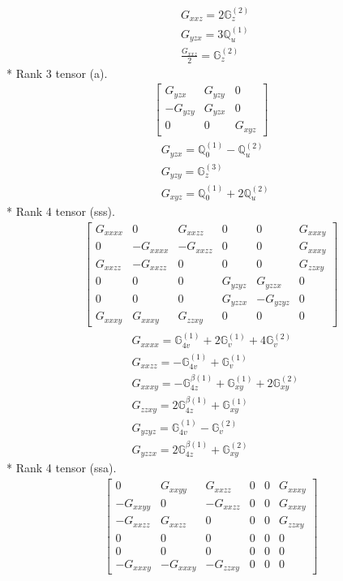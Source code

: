 \documentclass[fleqn,8pt,landscape]{jsarticle}
\begin{document}
\begin{align*}
& G_{xxz} = 2 \mathbb{G}_{z}^{(2)} \\
& G_{yzx} = 3 \mathbb{Q}_{u}^{(1)} \\
& \frac{G_{xxz}}{2} = \mathbb{G}_{z}^{(2)}
\end{align*}
* Rank 3 tensor (a).
\begin{align*}
\begin{bmatrix} G_{yzx} & G_{yzy} & 0 \\ - G_{yzy} & G_{yzx} & 0 \\ 0 & 0 & G_{xyz} \end{bmatrix}
\end{align*}
\begin{align*}
& G_{yzx} = \mathbb{Q}_{0}^{(1)} - \mathbb{Q}_{u}^{(2)} \\
& G_{yzy} = \mathbb{G}_{z}^{(3)} \\
& G_{xyz} = \mathbb{Q}_{0}^{(1)} + 2 \mathbb{Q}_{u}^{(2)}
\end{align*}
* Rank 4 tensor (sss).
\begin{align*}
\begin{bmatrix} G_{xxxx} & 0 & G_{xxzz} & 0 & 0 & G_{xxxy} \\ 0 & - G_{xxxx} & - G_{xxzz} & 0 & 0 & G_{xxxy} \\ G_{xxzz} & - G_{xxzz} & 0 & 0 & 0 & G_{zzxy} \\ 0 & 0 & 0 & G_{yzyz} & G_{yzzx} & 0 \\ 0 & 0 & 0 & G_{yzzx} & - G_{yzyz} & 0 \\ G_{xxxy} & G_{xxxy} & G_{zzxy} & 0 & 0 & 0 \end{bmatrix}
\end{align*}
\begin{align*}
& G_{xxxx} = \mathbb{G}_{4v}^{(1)} + 2 \mathbb{G}_{v}^{(1)} + 4 \mathbb{G}_{v}^{(2)} \\
& G_{xxzz} = - \mathbb{G}_{4v}^{(1)} + \mathbb{G}_{v}^{(1)} \\
& G_{xxxy} = - \mathbb{G}_{4z}^{\beta(1)} + \mathbb{G}_{xy}^{(1)} + 2 \mathbb{G}_{xy}^{(2)} \\
& G_{zzxy} = 2 \mathbb{G}_{4z}^{\beta(1)} + \mathbb{G}_{xy}^{(1)} \\
& G_{yzyz} = \mathbb{G}_{4v}^{(1)} - \mathbb{G}_{v}^{(2)} \\
& G_{yzzx} = 2 \mathbb{G}_{4z}^{\beta(1)} + \mathbb{G}_{xy}^{(2)}
\end{align*}
* Rank 4 tensor (ssa).
\begin{align*}
\begin{bmatrix} 0 & G_{xxyy} & G_{xxzz} & 0 & 0 & G_{xxxy} \\ - G_{xxyy} & 0 & - G_{xxzz} & 0 & 0 & G_{xxxy} \\ - G_{xxzz} & G_{xxzz} & 0 & 0 & 0 & G_{zzxy} \\ 0 & 0 & 0 & 0 & 0 & 0 \\ 0 & 0 & 0 & 0 & 0 & 0 \\ - G_{xxxy} & - G_{xxxy} & - G_{zzxy} & 0 & 0 & 0 \end{bmatrix}
\end{align*}
\end{document}
